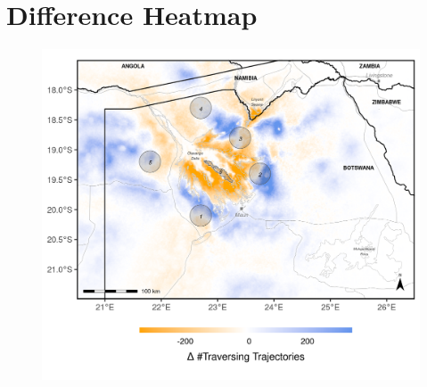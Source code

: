 \documentclass[abstract=on,10pt,a4paper,bibliography=totocnumbered]{article}
\begin{document}
\section{Difference Heatmap}
\begin{figure}[htbp]
  \begin{center}
  \includegraphics[width = \textwidth]{99_HeatmapsDifference.png}
  \caption{}
  \label{HeatmapsDifference}
  \end{center}
\end{figure}

\newpage
\end{document}
